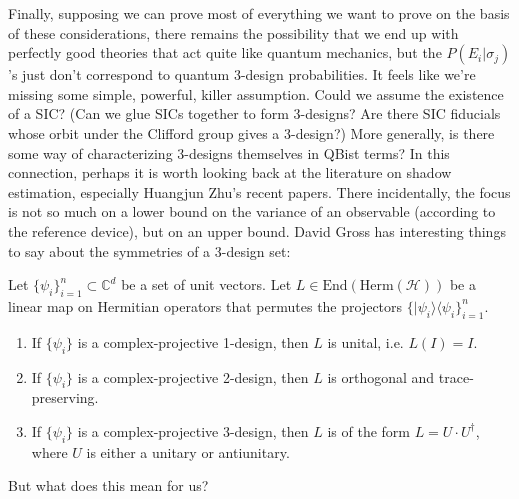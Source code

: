 \documentclass[11pt]{article}
\begin{document}
Finally, supposing we can prove most of everything we want to prove on the basis of these considerations, there remains the possibility that we end up with perfectly good theories that act quite like quantum mechanics, but the $P(E_i|\sigma_j)$'s just don't correspond to quantum 3-design probabilities. It feels like we're missing some simple, powerful, killer assumption. Could we assume the existence of a SIC? (Can we glue SICs together to form 3-designs? Are there SIC fiducials whose orbit under the Clifford group gives a 3-design?) More generally, is there some way of characterizing 3-designs themselves in QBist terms? In this connection, perhaps it is worth looking back at the literature on shadow estimation, especially Huangjun Zhu's recent papers. There incidentally, the focus is not so much on a lower bound on the variance of an observable (according to the reference device), but on an upper bound. David Gross  has interesting things to say about the symmetries of a 3-design set:
\begin{theorem}
Let $\{\psi_i\}_{i=1}^n\subset \mathbb{C}^d$ be a set of unit vectors. Let $L\in \text{End}(\text{Herm}(\mathcal{H}))$ be a linear map on Hermitian operators that permutes the projectors $\{|\psi_i\rangle\langle \psi_i\}_{i=1}^n$.
\begin{enumerate}
\item If $\{\psi_i\}$ is a complex-projective 1-design, then $L$ is unital, i.e. $L(I)=I$.
\item If $\{\psi_i\}$ is a complex-projective 2-design, then $L$ is orthogonal and trace-preserving.
\item If $\{\psi_i\}$ is a complex-projective 3-design, then $L$ is of the form $L=U \cdot U^\dagger$, where $U$ is either a unitary or antiunitary.
\end{enumerate}
\end{theorem}
\noindent But what does this mean for us?
\end{document}
